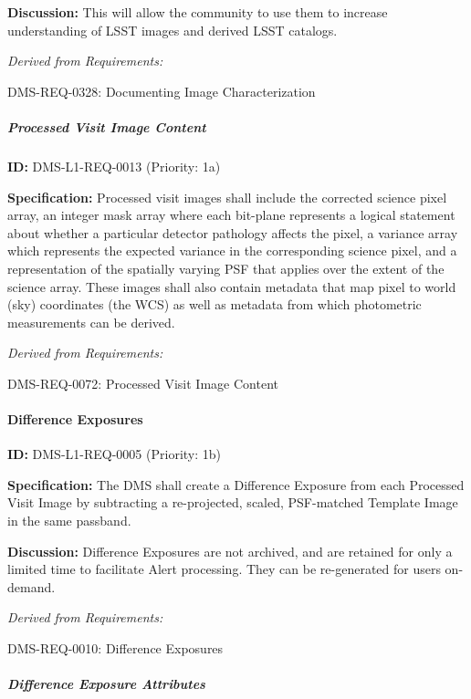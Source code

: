 \documentclass[SE,toc,lsstdraft]{lsstdoc}
\begin{document}
\textbf{Discussion:} This will allow the community to use them to increase understanding of LSST images and derived LSST catalogs.

\emph{Derived from Requirements:}

DMS-REQ-0328:
Documenting Image Characterization \newline

\subparagraph{Processed Visit Image Content}\hfill  %

\label{DMS-L1-REQ-0013}
\textbf{ID:} DMS-L1-REQ-0013 (Priority: 1a)

\textbf{Specification:} Processed visit images shall include the corrected science pixel array, an integer mask array where each bit-plane represents a logical statement about whether a particular detector pathology affects the pixel, a variance array which represents the expected variance in the corresponding science pixel, and a representation of the spatially varying PSF that applies over the extent of the science array. These images shall also contain metadata that map pixel to world (sky) coordinates (the WCS) as well as metadata from which photometric measurements can be derived.

\emph{Derived from Requirements:}

DMS-REQ-0072:
Processed Visit Image Content \newline

\paragraph{Difference Exposures}\hfill  %

\label{DMS-L1-REQ-0005}
\textbf{ID:} DMS-L1-REQ-0005 (Priority: 1b)

\textbf{Specification:} The DMS shall create a Difference Exposure from each Processed Visit Image by subtracting a re-projected, scaled, PSF-matched Template Image in the same passband.

\textbf{Discussion:} Difference Exposures are not archived, and are retained for only a limited time to facilitate Alert processing. They can be re-generated for users on-demand.

\emph{Derived from Requirements:}

DMS-REQ-0010:
Difference Exposures \newline

\subparagraph{Difference Exposure Attributes}\hfill  %
\end{document}
